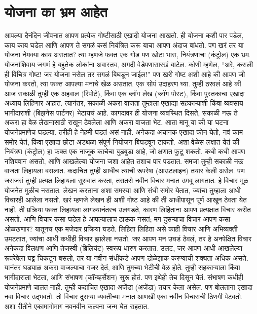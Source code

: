  \chapter{योजना का भ्रम आहेत}
आपल्या दैनंदिन जीवनात आपण प्रत्येक गोष्टीसाठी एखादी योजना आखतो. ही योजना कशी पार पडेल, काय काय घडेल आणि आपण ते सगळं कसं नियंत्रित करू याचा आपण अंदाज बांधतो. पण खरं तर या योजना नेमक्या काय असतात? त्या म्हणजे फक्त एक गोड पण खोटा भास, नियंत्रणाचा (कंट्रोल) एक भ्रम.
योजनांशिवाय जगणं हे बहुतेक लोकांना अवास्तव, अगदी वेडेपणासारखं वाटेल. कोणी म्हणेल, “अरे, कसली ही विचित्र गोष्ट! जर योजना नसेल तर सगळं बिघडून जाईल!” पण खरी गोष्ट अशी आहे की आपण जी योजना करतो, त्या फक्त आपल्या मनाचे खेळ असतात.
एक सोपं उदाहरण घ्या. तुम्ही ठरवलं आहे की आज सकाळी तुम्ही एक अहवाल (रिपोर्ट), किंवा एक ब्लॉग लेख (ब्लॉग पोस्ट), किंवा पुस्तकाचा एखादा अध्याय लिहिणार आहात. त्यानंतर, सकाळी अकरा वाजता तुम्हाला एखाद्या सहकाऱ्याशी किंवा व्यवसाय भागीदाराशी (बिझनेस पार्टनर) भेटायचं आहे. कागदावर ही योजना व्यवस्थित दिसते, सकाळी नऊ ते अकरा हा वेळ लेखनासाठी राखून ठेवलेला आणि अकरा वाजता भेट.
आता मानू या की या घटना योजनेप्रमाणेच घडल्या. तरीही हे नेहमी घडतं असं नाही. अनेकदा अचानक एखादा फोन येतो, नवं काम समोर येतं, किंवा एखादा छोटा अडथळा संपूर्ण नियोजन बिघडवून टाकतो. अशा वेळेस लक्षात येतं की नियंत्रण (कंट्रोल) हा फक्त एक नाजूक काचेचा बुडबुडा आहे, जो क्षणात फुटू शकतो.
कधी कधी आपण नशिबवान असतो, आणि आखलेल्या योजना जशा आहेत तशाच पार पडतात. समजा तुम्ही सकाळी नऊ वाजता लिहायला बसलात. कदाचित तुम्ही आधीच त्याची रूपरेषा (आउटलाइन) तयार केली असेल. पण जसजसं तुम्ही प्रत्यक्ष लिहायला सुरुवात करता, तसतसे नवीन विचार मनात उगवू लागतात. हे विचार मूळ योजनेत मुळीच नसतात.
लेखन करताना अशा समस्या आणि संधी समोर येतात, ज्यांचा तुम्हाला आधी विचारही आलेला नसतो. खरं म्हणजे लेखन ही अशी गोष्ट आहे की ती आधीपासून पूर्ण आखून ठेवता येत नाही. ती प्रक्रिया फक्त लिहायला लागल्यानंतरच उलगडते, कारण लिहिताना आपण प्रत्यक्षात विचार करीत असतो. आणि विचार कसा घडेल हे आपल्यालाच ठाऊक नसतं; मग दुसऱ्याचा विचार आपण कसा ओळखणार?
यातूनच एक मजेदार प्रक्रिया घडते. लिहिता लिहिता असे काही विचार आणि अभिव्यक्ती उमटतात, ज्यांचा आधी कधीही विचार झालेला नसतो. जर आपण मन उघडं ठेवलं, तर हे अनपेक्षित विचार अनेकदा विलक्षण आणि तेजस्वी (ब्रिलियंट) स्वरूप धारण करतात. उलट, जर आपण आधी आखलेल्या रूपरेषेला घट्ट चिकटून बसलो, तर या नवीन संधींकडे आपण डोळेझाक करण्याची शक्यता अधिक असते.
यानंतर घड्याळ अकरा वाजल्याचा गजर देतं, आणि तुमच्या भेटीची वेळ होते. तुम्ही सहकाऱ्याला किंवा भागीदाराला भेटता, आणि संभाषण (कॉन्व्हर्सेशन) सुरू होतं. पण इथेही तेच दिसून येतं. संभाषण कधीही योजनेप्रमाणे चालत नाही. तुम्ही कदाचित एखादा अजेंडा (अजेंडा) तयार केला असेल, पण बोलताना एखादा नवा विचार उद्भवतो. तो विचार दुसऱ्या व्यक्तीच्या मनात आणखी एका नवीन विचाराची ठिणगी पेटवतो. अशा रीतीने एकामागोमाग नवनवीन कल्पना जन्म घेत राहतात.
